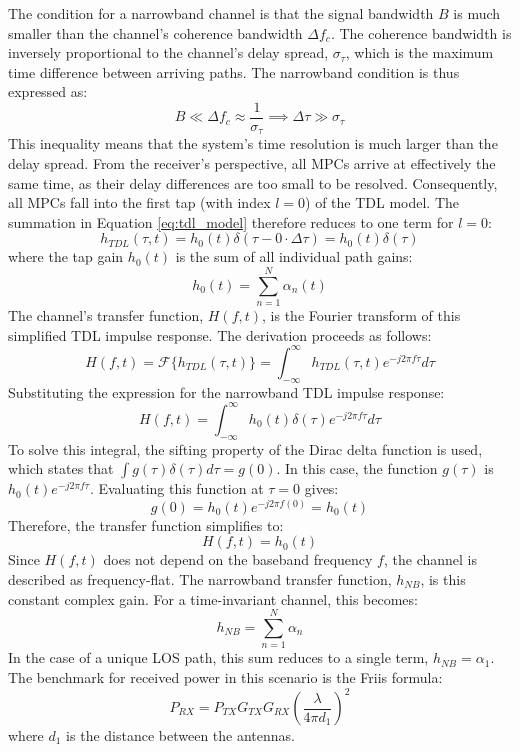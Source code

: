 The condition for a narrowband channel is that the signal bandwidth $B$ is much smaller than the channel's coherence bandwidth $\Delta f_c$. The coherence bandwidth is inversely proportional to the channel's delay spread, $\sigma_\tau$, which is the maximum time difference between arriving paths. The narrowband condition is thus expressed as:
\begin{equation}
	B \ll \Delta f_c \approx \frac{1}{\sigma_\tau} \implies \Delta\tau \gg \sigma_\tau
\end{equation}
This inequality means that the system's time resolution is much larger than the delay spread. From the receiver's perspective, all MPCs arrive at effectively the same time, as their delay differences are too small to be resolved. Consequently, all MPCs fall into the first tap (with index $l=0$) of the TDL model. The summation in Equation \ref{eq:tdl_model} therefore reduces to one term for $l=0$:
\begin{equation}
	h_{TDL}(\tau, t) = h_0(t) \delta(\tau - 0 \cdot \Delta\tau) = h_0(t) \delta(\tau)
\end{equation}
where the tap gain $h_0(t)$ is the sum of all individual path gains:
\begin{equation}
	h_0(t) = \sum_{n=1}^{N} \alpha_n(t)
\end{equation}
The channel's transfer function, $H(f,t)$, is the Fourier transform of this simplified TDL impulse response. The derivation proceeds as follows:
\begin{equation}
	H(f,t) = \mathcal{F}\{h_{TDL}(\tau, t)\} = \int_{-\infty}^{\infty} h_{TDL}(\tau, t) e^{-j2\pi f \tau} d\tau
\end{equation}
Substituting the expression for the narrowband TDL impulse response:
\begin{equation}
	H(f,t) = \int_{-\infty}^{\infty} h_0(t)\delta(\tau) e^{-j2\pi f \tau} d\tau
\end{equation}
To solve this integral, the sifting property of the Dirac delta function is used, which states that $\int g(\tau)\delta(\tau)d\tau = g(0)$. In this case, the function $g(\tau)$ is $h_0(t)e^{-j2\pi f \tau}$. Evaluating this function at $\tau=0$ gives:
\begin{equation}
	g(0) = h_0(t)e^{-j2\pi f (0)} = h_0(t)
\end{equation}
Therefore, the transfer function simplifies to:
\begin{equation}
	H(f,t) = h_0(t)
\end{equation}
Since $H(f,t)$ does not depend on the baseband frequency $f$, the channel is described as frequency-flat. The narrowband transfer function, $h_{NB}$, is this constant complex gain. For a time-invariant channel, this becomes:
\begin{equation}
	h_{NB} = \sum_{n=1}^{N} \alpha_n
\end{equation}
In the case of a unique LOS path, this sum reduces to a single term, $h_{NB} = \alpha_1$. 
The benchmark for received power in this scenario is the Friis formula:
\begin{equation}
	P_{RX} = P_{TX} G_{TX} G_{RX} \left(\frac{\lambda}{4\pi d_1}\right)^2
	\label{eq:friis_formula_bg}
\end{equation}
where $d_1$ is the distance between the antennas.

